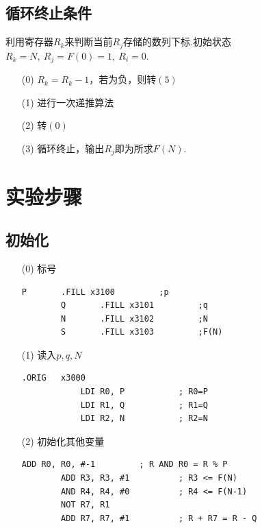 \documentclass[UTF8]{ctexart}
\begin{document}
    \subsection{循环终止条件}
    利用寄存器$R_k$来判断当前$R_j$存储的数列下标.初始状态$R_k=N,\ R_j=F(0)=1,\ R_i=0$.
    \begin{enumerate}
        \item [(0)]$R_k = R_k - 1$，若为负，则转$(5)$ 
        \item [(1)]进行一次递推算法
        \item [(2)]转$(0)$
        \item [(3)]循环终止，输出$R_j$即为所求$F(N)$.
    \end{enumerate}

\section{实验步骤}
\subsection{初始化}
\begin{enumerate}
    \item [(0)]标号
    \begin{lstlisting}[basicstyle=\ttfamily,language={[x86masm]Assembler}]
        P       .FILL x3100         ;p
        Q       .FILL x3101         ;q
        N       .FILL x3102         ;N
        S       .FILL x3103         ;F(N)
    \end{lstlisting}

    \item [(1)]读入$p,q,N$
    \begin{lstlisting}[basicstyle=\ttfamily,language={[x86masm]Assembler}]
        .ORIG   x3000
            LDI R0, P           ; R0=P
            LDI R1, Q           ; R1=Q
            LDI R2, N           ; R2=N
    \end{lstlisting}

    \item [(2)]初始化其他变量
    \begin{lstlisting}[basicstyle=\ttfamily,language={[x86masm]Assembler}]
        ADD R0, R0, #-1         ; R AND R0 = R % P
        ADD R3, R3, #1          ; R3 <= F(N)
        AND R4, R4, #0          ; R4 <= F(N-1)
        NOT R7, R1          
        ADD R7, R7, #1          ; R + R7 = R - Q
    \end{lstlisting}
\end{enumerate}
\end{document}
